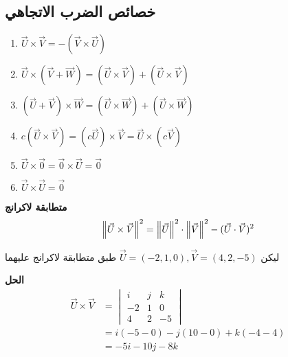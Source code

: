 \subsection*{خصائص الضرب الاتجاهي}
\begin{english}
	\begin{enumerate}
		\item $\vec{U}\times\vec{V} = -(\vec{V}\times\vec{U})$
		\item $\vec{U}\times(\vec{V} + \vec{W}) = (\vec{U}\times\vec{V}) + (\vec{U}\times\vec{V})$
		\item $(\vec{U}+\vec{V})\times\vec{W} = (\vec{U}\times\vec{W}) + (\vec{U}\times\vec{W})$
		\item $c(\vec{U}\times\vec{V}) = (c\vec{U})\times\vec{V} = \vec{U}\times(c
		\vec{V})$
		\item $\vec{U}\times\vec{0} = \vec{0}\times\vec{U} = \vec{0}$
		\item $\vec{U}\times\vec{U} = \vec{0}$
	\end{enumerate}
\end{english}
\noindent
\textbf{متطابقة لاكرانج}
\[
\left\lVert\vec{U}\times\vec{V}\right\rVert^2 = \left\lVert\vec{U}\right\rVert^2 \cdot \left\lVert\vec{V}\right\rVert^2 - (\vec{U}\cdot\vec{V})^2
\]

\begin{example}
	ليكن
	$\vec{U}=(-2, 1,0) , \vec{V}=(4,2,-5)$
	طبق متطابقة لاكرانج عليهما
\end{example}
\noindent
\textbf{الحل}
\begin{align*}
		\vec{U}\times\vec{V} & = 
	\begin{vmatrix}
		i & j & k\\
		-2 & 1 & 0\\
		4 & 2 & -5
	\end{vmatrix}\\
	&= i(-5-0) - j(10-0) + k(-4-4)\\
	&= -5i -10j -8k
\end{align*}

